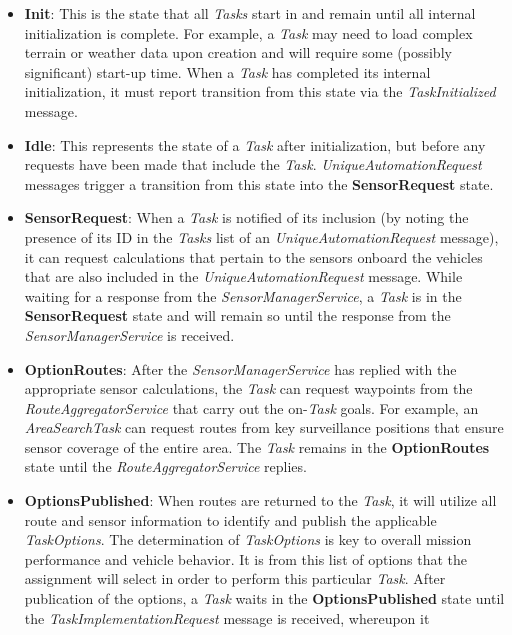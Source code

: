 \begin{itemize}
\tightlist
\item
  \textbf{Init}: This is the state that all \emph{Tasks} start in and
  remain until all internal initialization is complete. For example, a
  \emph{Task} may need to load complex terrain or weather data upon
  creation and will require some (possibly significant) start-up time.
  When a \emph{Task} has completed its internal initialization, it must
  report transition from this state via the \emph{TaskInitialized}
  message.
\item
  \textbf{Idle}: This represents the state of a \emph{Task} after
  initialization, but before any requests have been made that include
  the \emph{Task}. \emph{UniqueAutomationRequest} messages trigger a
  transition from this state into the \textbf{SensorRequest} state.
\item
  \textbf{SensorRequest}: When a \emph{Task} is notified of its
  inclusion (by noting the presence of its ID in the \emph{Tasks} list
  of an \emph{UniqueAutomationRequest} message), it can request
  calculations that pertain to the sensors onboard the vehicles that are
  also included in the \emph{UniqueAutomationRequest} message. While
  waiting for a response from the \emph{SensorManagerService}, a
  \emph{Task} is in the \textbf{SensorRequest} state and will remain so
  until the response from the \emph{SensorManagerService} is received.
\item
  \textbf{OptionRoutes}: After the \emph{SensorManagerService} has
  replied with the appropriate sensor calculations, the \emph{Task} can
  request waypoints from the \emph{RouteAggregatorService} that carry
  out the on-\emph{Task} goals. For example, an \emph{AreaSearchTask}
  can request routes from key surveillance positions that ensure sensor
  coverage of the entire area. The \emph{Task} remains in the
  \textbf{OptionRoutes} state until the \emph{RouteAggregatorService}
  replies.
\item
  \textbf{OptionsPublished}: When routes are returned to the
  \emph{Task}, it will utilize all route and sensor information to
  identify and publish the applicable \emph{TaskOptions}. The
  determination of \emph{TaskOptions} is key to overall mission
  performance and vehicle behavior. It is from this list of options that
  the assignment will select in order to perform this particular
  \emph{Task}. After publication of the options, a \emph{Task} waits in
  the \textbf{OptionsPublished} state until the
  \emph{TaskImplementationRequest} message is received, whereupon it

\end{itemize}
